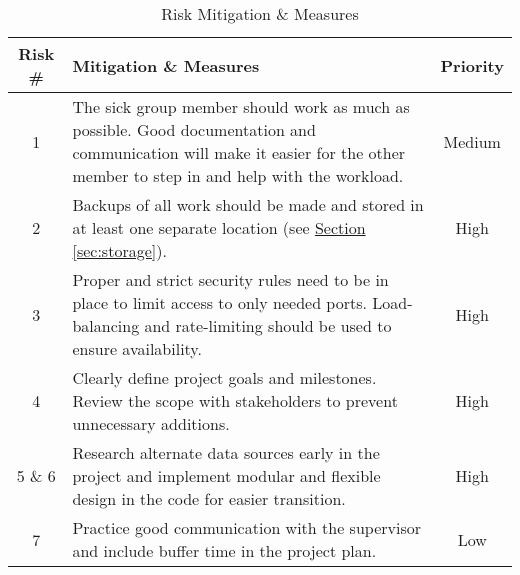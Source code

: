 \begin{table}[H]
    \centering
    \begin{tabularx}{\textwidth}{|c|>{\centering\arraybackslash}X|c|}
    \hline
    \textbf{Risk \#} & \textbf{Mitigation \& Measures} & \textbf{Priority} \\
    \hline
    1 & The sick group member should work as much as possible. Good documentation and communication will make it easier for the other member to step in and help with the workload. & Medium \cellcolor[HTML]{fff000} \\
    \hline
    2 & Backups of all work should be made and stored in at least one separate location (see \hyperref[sec:storage]{Section \ref*{sec:storage}}). & High \cellcolor[HTML]{ff4233} \\
    \hline
    3 & Proper and strict security rules need to be in place to limit access to only needed ports. Load-balancing and rate-limiting should be used to ensure availability. & High \cellcolor[HTML]{ff4233} \\
    \hline
    4 & Clearly define project goals and milestones. Review the scope with stakeholders to prevent unnecessary additions. & High \cellcolor[HTML]{ff4233} \\
    \hline
    5 \& 6 & Research alternate data sources early in the project and implement modular and flexible design in the code for easier transition. & High \cellcolor[HTML]{ff4233} \\
    \hline
    7 & Practice good communication with the supervisor and include buffer time in the project plan. & Low \cellcolor[HTML]{74ff00} \\
    \hline
    \end{tabularx}
    \caption{Risk Mitigation \& Measures}
    \label{tab:risk_mitigation}
\end{table}

\newpage
